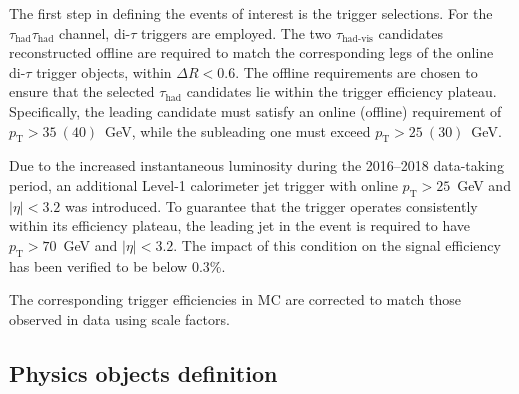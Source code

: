 The first step in defining the events of interest is the trigger selections. 
For the $\tau_{\text{had}}\tau_{\text{had}}$ channel, di-$\tau$ triggers are employed. The two $\tau_{\text{had-vis}}$ candidates reconstructed offline are required to match the corresponding legs of the online di-$\tau$ trigger objects, within $\Delta R < 0.6$. The offline \pt requirements are chosen to ensure that the selected $\tau_{\text{had}}$ candidates lie within the trigger efficiency plateau. Specifically, the leading \tauhadvis candidate must satisfy an online (offline) requirement of $p_{\text{T}} > 35~(40)$~GeV, while the subleading one must exceed $p_{\text{T}} > 25~(30)$~GeV.  

Due to the increased instantaneous luminosity during the 2016--2018 data-taking period, an additional Level-1 calorimeter jet trigger with online $p_{\text{T}} > 25$~GeV and $|\eta| < 3.2$ was introduced. To guarantee that the trigger operates consistently within its efficiency plateau, the leading jet in the event is required to have $p_{\text{T}} > 70$~GeV and $|\eta| < 3.2$. The impact of this condition on the signal efficiency has been verified to be below $0.3\%$.

The corresponding trigger efficiencies in MC are corrected to match those observed in data using scale factors.  

\subsection{Physics objects definition}
\label{subsec:object_def}

